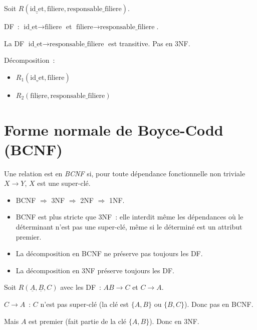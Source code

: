 \begin{exemple}
Soit $R(\underline{\text{id\_et}}, \text{filiere}, \text{responsable\_filiere})$.

DF~: $\text{id\_et} \to \text{filiere}$ et $\text{filiere} \to \text{responsable\_filiere}$.

La DF $\text{id\_et} \to \text{responsable\_filiere}$ est transitive. Pas en 3NF.

D\'ecomposition~:
\begin{itemize}
    \item $R_1(\underline{\text{id\_et}}, \text{filiere})$
    \item $R_2(\underline{\text{filiere}}, \text{responsable\_filiere})$
\end{itemize}
\end{exemple}

\section{Forme normale de Boyce-Codd (BCNF)}

\begin{definition}[BCNF]
Une relation est en \emph{BCNF} si, pour toute d\'ependance fonctionnelle
non triviale $X \to Y$, $X$ est une super-cl\'e.
\end{definition}

\begin{theoreme}[BCNF vs.\ 3NF]
\begin{itemize}
    \item BCNF $\Rightarrow$ 3NF $\Rightarrow$ 2NF $\Rightarrow$ 1NF.
    \item BCNF est plus stricte que 3NF~: elle interdit m\^eme les d\'ependances
          o\`u le d\'eterminant n'est pas une super-cl\'e, m\^eme si le d\'etermin\'e
          est un attribut premier.
    \item La d\'ecomposition en BCNF ne pr\'eserve pas toujours les DF.
    \item La d\'ecomposition en 3NF pr\'eserve toujours les DF.
\end{itemize}
\end{theoreme}

\begin{exemple}
Soit $R(\underline{A}, \underline{B}, C)$ avec les DF~: $AB \to C$ et $C \to A$.

$C \to A$~: $C$ n'est pas super-cl\'e (la cl\'e est $\{A, B\}$ ou $\{B, C\}$).
Donc pas en BCNF.

Mais $A$ est premier (fait partie de la cl\'e $\{A, B\}$). Donc en 3NF.
\end{exemple}

